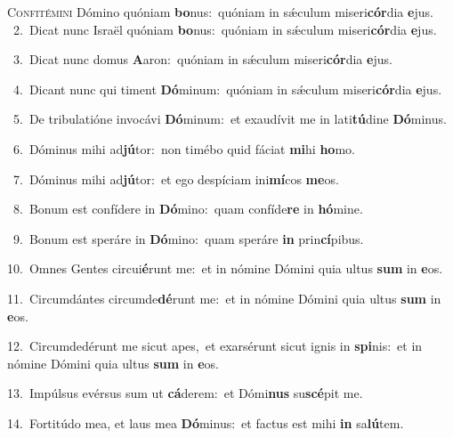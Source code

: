 \lettrine{\initial\textcolor{\initialcolor}{C}}{onfitémini} Dómino quóniam \textbf{bo}\-nus:~\star quóniam in sǽculum miseri\-\textbf{cór}\-dia \textbf{e}\-jus.\\
{\numbfont\textcolor{\numbcolor}{~2.}}~Dicat nunc Israël quóniam \textbf{bo}\-nus:~\star quóniam in sǽculum miseri\-\textbf{cór}\-dia \textbf{e}\-jus.\par
{\numbfont\textcolor{\numbcolor}{~3.}}~Dicat nunc domus \textbf{A}\-aron:~\star quóniam in sǽculum miseri\-\textbf{cór}\-dia \textbf{e}\-jus.\par
{\numbfont\textcolor{\numbcolor}{~4.}}~Dicant nunc qui timent \textbf{Dó}\-minum:~\star quóniam in sǽculum miseri\-\textbf{cór}\-dia \textbf{e}\-jus.\par
{\numbfont\textcolor{\numbcolor}{~5.}}~De tribulatióne invocávi \textbf{Dó}\-minum:~\star et exaudívit me in lati\-\textbf{tú}\-dine \textbf{Dó}\-minus.\par
{\numbfont\textcolor{\numbcolor}{~6.}}~Dóminus mihi ad\-\textbf{jú}\-tor:~\star non timébo quid fáciat \textbf{mi}\-hi \textbf{ho}\-mo.\par
{\numbfont\textcolor{\numbcolor}{~7.}}~Dóminus mihi ad\-\textbf{jú}\-tor:~\star et ego despíciam ini\-\textbf{mí}\-cos \textbf{me}\-os.\par
{\numbfont\textcolor{\numbcolor}{~8.}}~Bonum est confídere in \textbf{Dó}\-mino:~\star quam confíde\textbf{re} in \textbf{hó}\-mine.\par
{\numbfont\textcolor{\numbcolor}{~9.}}~Bonum est speráre in \textbf{Dó}\-mino:~\star quam speráre \textbf{in} prin\-\textbf{cí}\-pibus.\par
{\numbfont\textcolor{\numbcolor}{10.}}~Omnes Gentes circui\-\textbf{é}\-runt me:~\star et in nómine Dómini quia ultus \textbf{sum} in \textbf{e}\-os.\par
{\numbfont\textcolor{\numbcolor}{11.}}~Circumdántes circumde\-\textbf{dé}\-runt me:~\star et in nómine Dómini quia ultus \textbf{sum} in \textbf{e}\-os.\par
{\numbfont\textcolor{\numbcolor}{12.}}~Circumdedérunt me sicut apes,~\dagger et exarsérunt sicut ignis in \textbf{spi}\-nis:~\star et in nómine Dómini quia ultus \textbf{sum} in \textbf{e}\-os.\par
{\numbfont\textcolor{\numbcolor}{13.}}~Impúlsus evérsus sum ut \textbf{cá}\-derem:~\star et Dómi\textbf{nus} su\-\textbf{scé}\-pit me.\par
{\numbfont\textcolor{\numbcolor}{14.}}~Fortitúdo mea, et laus mea \textbf{Dó}\-minus:~\star et factus est mihi \textbf{in} sa\-\textbf{lú}\-tem.\par
